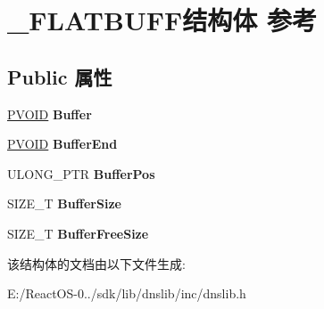 \hypertarget{struct___f_l_a_t_b_u_f_f}{}\section{\+\_\+\+F\+L\+A\+T\+B\+U\+F\+F结构体 参考}
\label{struct___f_l_a_t_b_u_f_f}
\subsection*{Public 属性}
\begin{DoxyCompactItemize}
\item 
\mbox{\label{struct___f_l_a_t_b_u_f_f_abf4f2f6c57c07fe098f8372f91e16b88}} 
\hyperlink{interfacevoid}{P\+V\+O\+ID} {\bfseries Buffer}
\item 
\mbox{\label{struct___f_l_a_t_b_u_f_f_aa70bd39777ad8a45b1a6a303293ded46}} 
\hyperlink{interfacevoid}{P\+V\+O\+ID} {\bfseries Buffer\+End}
\item 
\mbox{\label{struct___f_l_a_t_b_u_f_f_a611a3b7c313e7685bb817cf456b788c9}} 
U\+L\+O\+N\+G\+\_\+\+P\+TR {\bfseries Buffer\+Pos}
\item 
\mbox{\label{struct___f_l_a_t_b_u_f_f_a3d84a02140ee9918e1eeefaa3ec4a51e}} 
S\+I\+Z\+E\+\_\+T {\bfseries Buffer\+Size}
\item 
\mbox{\label{struct___f_l_a_t_b_u_f_f_a187e71cd01e3c64b24746011f8262b04}} 
S\+I\+Z\+E\+\_\+T {\bfseries Buffer\+Free\+Size}
\end{DoxyCompactItemize}


该结构体的文档由以下文件生成\+:\begin{DoxyCompactItemize}
\item 
E\+:/\+React\+O\+S-\/0../sdk/lib/dnslib/inc/dnslib.\+h\end{DoxyCompactItemize}
